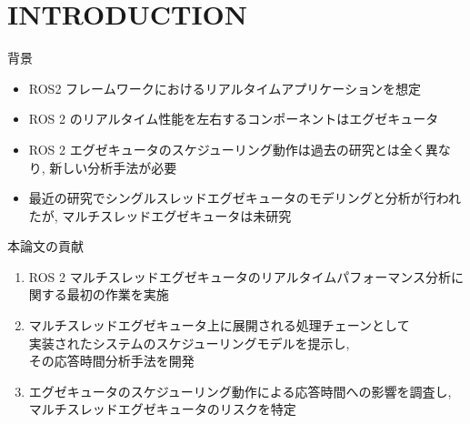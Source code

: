 
\section{INTRODUCTION}
\label{sec: introduction}

\begin{frame}{背景}
    \begin{itemize}
        \item ROS2 フレームワークにおけるリアルタイムアプリケーションを想定
        \item ROS 2 のリアルタイム性能を左右するコンポーネントはエグゼキュータ
        \item ROS 2 エグゼキュータのスケジューリング動作は過去の研究とは全く異なり, 新しい分析手法が必要
        \item 最近の研究でシングルスレッドエグゼキュータのモデリングと分析が行われたが, マルチスレッドエグゼキュータは未研究
    \end{itemize}
\end{frame}

\begin{frame}{本論文の貢献}
    \begin{enumerate}
        \item ROS 2 マルチスレッドエグゼキュータのリアルタイムパフォーマンス分析に\\関する最初の作業を実施
        \item マルチスレッドエグゼキュータ上に展開される処理チェーンとして\\実装されたシステムのスケジューリングモデルを提示し,\\その応答時間分析手法を開発
        \item エグゼキュータのスケジューリング動作による応答時間への影響を調査し, マルチスレッドエグゼキュータのリスクを特定
    \end{enumerate}
\end{frame}
